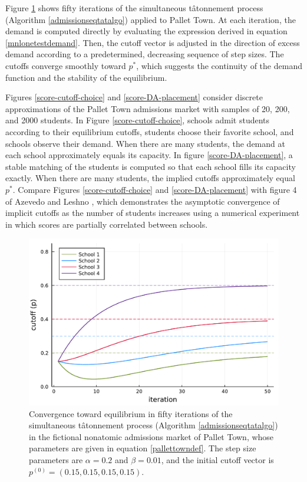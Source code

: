 \documentclass[12pt]{article}
\numberwithin{equation}{subsection}
\theoremstyle{definition}
\begin{document}
Figure \ref{tat-iter-cutoff} shows fifty iterations of the simultaneous t\^{a}tonnement process (Algorithm \ref{admissionseqtatalgo}) applied to Pallet Town. At each iteration, the demand is computed directly by evaluating the expression derived in equation \eqref{mnlonetestdemand}. Then, the cutoff vector is adjusted in the direction of excess demand according to a predetermined, decreasing sequence of step sizes. The cutoffs converge smoothly toward $p^*$, which suggests the continuity of the demand function and the stability of the equilibrium. 

Figures \ref{score-cutoff-choice} and \ref{score-DA-placement} consider discrete approximations of the Pallet Town admissions market with samples of 20, 200, and 2000 students. In Figure \ref{score-cutoff-choice}, schools admit students according to their equilibrium cutoffs, students choose their favorite school, and schools observe their demand. When there are many students, the demand at each school approximately equals its capacity. In figure \ref{score-DA-placement}, a stable matching of the students is computed so that each school fills its capacity exactly. When there are many students, the implied cutoffs approximately equal $p^*$. Compare Figures \ref{score-cutoff-choice} and \ref{score-DA-placement} with figure 4 of Azevedo and Leshno \parencite*{supplydemandfw}, which demonstrates the asymptotic convergence of implicit cutoffs as the number of students increases using a numerical experiment in which scores are partially correlated between schools. 

\begin{figure}
\begin{center}\includegraphics[width=\linewidth, ]{plots/tat-iter-cutoff.pdf}\end{center}
\captionsetup{singlelinecheck=off}
    \caption[.]{Convergence toward equilibrium in fifty iterations of the simultaneous t\^{a}tonnement process (Algorithm \ref{admissionseqtatalgo}) in the fictional nonatomic admissions market of Pallet Town, whose parameters are given in equation \eqref{pallettowndef}. The step size parameters are $\alpha = 0.2$ and $\beta = 0.01$, and the initial cutoff vector is $p^{(0)} = (0.15, 0.15, 0.15, 0.15)$. }
\label{tat-iter-cutoff}
\end{figure}
\end{document}
